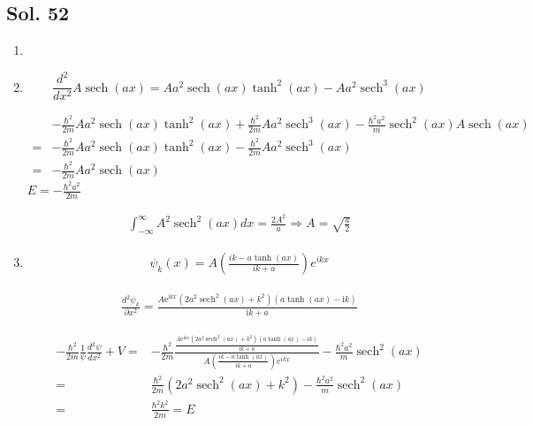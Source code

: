 \subsection*{Sol. 52}
\begin{enumerate}
    \item 
    \item 
    $$
    \frac{d^2}{dx^2}A\operatorname{sech}(ax)=
    Aa^{2} \operatorname{sech}\left(ax\right) \tanh^{2}\left(ax\right) - Aa^{2} \operatorname{sech}^{3}\left(ax\right)
    $$

    \begin{align*}
        &-\frac{\hbar^2}{2m}
    Aa^{2} \operatorname{sech}\left(ax\right) \tanh^{2}\left(ax\right) +
    \frac{\hbar^2}{2m}
    Aa^{2} \operatorname{sech}^{3}\left(ax\right)
    -
    \frac{\hbar^2a^2}{m}
    \operatorname{sech}^2(ax)
    A\operatorname{sech}(ax)\\
    =&
    -\frac{\hbar^2}{2m}
    Aa^{2} \operatorname{sech}\left(ax\right) \tanh^{2}\left(ax\right) -
    \frac{\hbar^2}{2m}Aa^{2} \operatorname{sech}^{3}\left(ax\right)\\
    =&-\frac{\hbar^2}{2m}Aa^2 \operatorname{sech}(ax)
    \end{align*}
    $
    E=-\frac{\hbar^2a^2}{2m}
    $

    \begin{align*}
        \int_{-\infty}^{\infty}
        A^2\operatorname{sech}^2(ax)dx=\frac{2A^2}{a}\Rightarrow A=\sqrt{\frac{a}{2}}
    \end{align*}


    \item 
    \begin{align*}
        \psi_k(x)=A\left(
        \frac{ik-a\operatorname{tanh}(ax)}{ik+a}
        \right)
        e^{ikx}
    \end{align*}
    
    \begin{align*}
        \frac{d^2\psi_k}{\partial x^2}
        =\frac{A\mathrm{e}^{\mathrm{i}kx} \left(2a^{2} \operatorname{sech}^{2}\left(ax\right) + k^{2}\right) \left(a \tanh\left(ax\right) - \mathrm{i}k\right)}{\mathrm{i}k + a}
    \end{align*}

    \begin{align*}
        -\frac{\hbar^2}{2m}\frac{1}{\psi}\frac{d^2\psi}{dx^2}
        +V =&
        -\frac{\hbar^2}{2m}
        \frac{\frac{A\mathrm{e}^{\mathrm{i}kx} \left(2a^{2} \operatorname{sech}^{2}\left(ax\right) + k^{2}\right) \left(a \tanh\left(ax\right) - \mathrm{i}k\right)}{\mathrm{i}k + a}}{A\left(
        \frac{ik-a\operatorname{tanh}(ax)}{ik+a}
        \right)
        e^{ikx}}
        -\frac{\hbar^2a^2}{m}\operatorname{sech}^2(ax)\\
        =&
        \frac{\hbar^2}{2m}
        \left(2a^{2} \operatorname{sech}^{2}\left(ax\right) + k^{2}\right)
        -\frac{\hbar^2a^2}{m}\operatorname{sech}^2(ax)\\
        =&\frac{\hbar^2k^2}{2m}=E
    \end{align*}


\end{enumerate}
